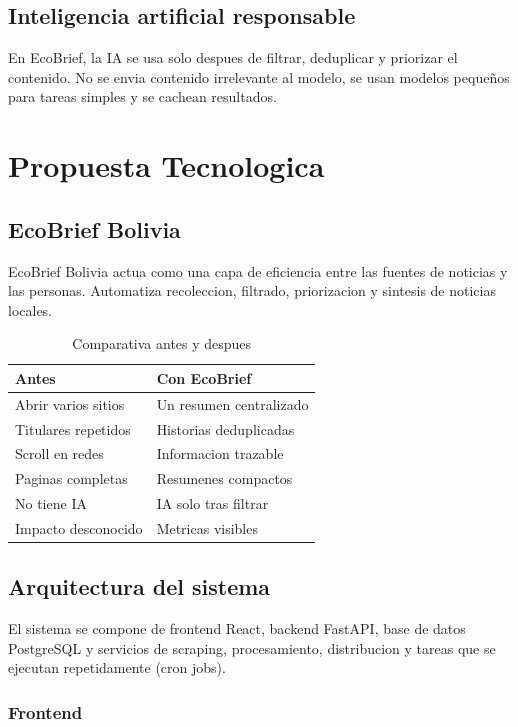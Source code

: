 \documentclass[12pt,oneside]{report}
\begin{document}
\section{Inteligencia artificial responsable}

En EcoBrief, la IA se usa solo despues de filtrar, deduplicar y priorizar el contenido. No se envia contenido irrelevante al modelo, se usan modelos pequeños para tareas simples y se cachean resultados.

\chapter{Propuesta Tecnologica}

\section{EcoBrief Bolivia}

EcoBrief Bolivia actua como una capa de eficiencia entre las fuentes de noticias y las personas. Automatiza recoleccion, filtrado, priorizacion y sintesis de noticias locales.

\begin{table}[H]
\centering
\begin{tabular}{p{6.5cm}p{6.5cm}}
\toprule
\textbf{Antes} & \textbf{Con EcoBrief} \\
\midrule
Abrir varios sitios & Un resumen centralizado \\
Titulares repetidos & Historias deduplicadas \\
Scroll en redes & Informacion trazable \\
Paginas completas & Resumenes compactos \\
No tiene IA & IA solo tras filtrar \\
Impacto desconocido & Metricas visibles \\
\bottomrule
\end{tabular}
\caption{Comparativa antes y despues}
\end{table}

\section{Arquitectura del sistema}

El sistema se compone de frontend React, backend FastAPI, base de datos PostgreSQL y servicios de scraping, procesamiento, distribucion y tareas que se ejecutan repetidamente (cron jobs).

\subsection{Frontend}
\end{document}
